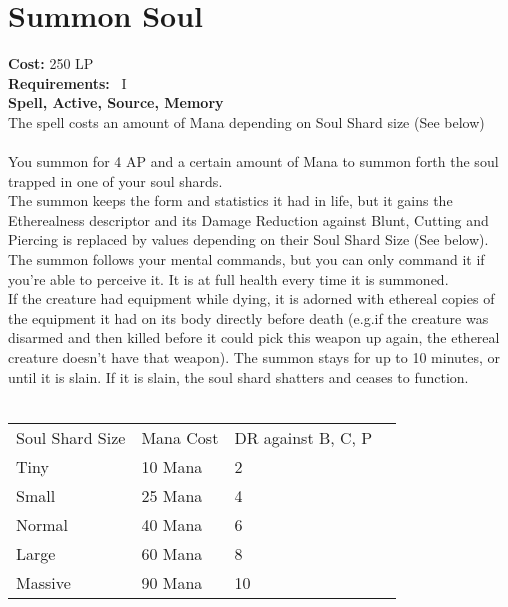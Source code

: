 \section{Summon Soul}\label{spell:summonSoul}
\textbf{Cost:} 250 LP\\
\textbf{Requirements:}~ I\\
\textbf{Spell, Active, Source, Memory}\\
The spell costs an amount of Mana depending on Soul Shard size (See below)\\
\\
You summon for 4 AP and a certain amount of Mana to summon forth the soul trapped in one of your soul shards.\\
The summon keeps the form and statistics it had in life, but it gains the Etherealness descriptor and its Damage Reduction against Blunt, Cutting and Piercing is replaced by values depending on their Soul Shard Size (See below).
The summon follows your mental commands, but you can only command it if you're able to perceive it.
It is at full health every time it is summoned.\\
If the creature had equipment while dying, it is adorned with ethereal copies of the equipment it had on its body directly before death (e.g.if the creature was disarmed and then killed before it could pick this weapon up again, the ethereal creature doesn't have that weapon).
The summon stays for up to 10 minutes, or until it is slain.
If it is slain, the soul shard shatters and ceases to function.\\
\\
\begin{longtable}{l | l | p{5.5cm} | p{2.5cm}}
    Soul Shard Size & Mana Cost & DR against B, C, P\\
    Tiny & 10 Mana & 2\\
    Small & 25 Mana & 4\\
    Normal & 40 Mana & 6\\
    Large & 60 Mana & 8\\
    Massive & 90 Mana & 10\\
\end{longtable}


